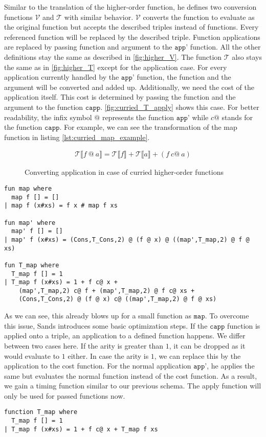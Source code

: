 Similar to the translation of the higher-order function, he defines two conversion functions $\mathcal{V}$ and $\mathcal{T}$ with similar behavior.
$\mathcal{V}$ converts the function to evaluate as the original function but accepts the described triples instead of functions.
Every referenced function will be replaced by the described triple.
Function applications are replaced by passing function and argument to the $\texttt{app'}$ function.
All the other definitions stay the same as described in \autoref{fig:higher_V}.
The function $\mathcal{T}$ also stays the same as in \autoref{fig:higher_T} except for the application case.
For every application currently handled by the $\texttt{app'}$ function, the function and the argument will be converted and added up.
Additionally, we need the cost of the application itself.
This cost is determined by passing the function and the argument to the function $\texttt{capp}$.
\autoref{fig:curried_T_apply} shows this case.
For better readability, the infix symbol $@$ represents the function $\texttt{app'}$ while $c@$ stands for the function $\texttt{capp}$.
For example, we can see the transformation of the map function in listing \ref{lst:curried_map_example}.
\begin{figure}
\begin{align*}
  \mathcal{T}\llbracket f\ @\ a\rrbracket = \mathcal{T}\llbracket f\rrbracket + \mathcal{T}\llbracket a\rrbracket + (f\ c@\ a)
\end{align*}
\caption{Converting application in case of curried higher-order functions}
\label{fig:curried_T_apply}
\end{figure}

\begin{lstlisting}[language=isabelle,mathescape=true,label=lst:curried_map_example,caption=Example translation for map function]
fun map where
  map f [] = []
| map f (x#xs) = f x # map f xs

fun map' where
  map' f [] = []
| map' f (x#xs) = (Cons,T_Cons,2) @ (f @ x) @ ((map',T_map,2) @ f @ xs)

fun T_map where
  T_map f [] = 1
| T_map f (x#xs) = 1 + f c@ x +
    (map',T_map,2) c@ f + (map',T_map,2) @ f c@ xs +
    (Cons,T_Cons,2) @ (f @ x) c@ ((map',T_map,2) @ f @ xs)
\end{lstlisting}

As we can see, this already blows up for a small function as $\texttt{map}$.
To overcome this issue, Sands introduces some basic optimization steps.
If the $\texttt{capp}$ function is applied onto a triple, an application to a defined function happens.
We differ between two cases here.
If the arity is greater than $1$, it can be dropped as it would evaluate to $1$ either.
In case the arity is $1$, we can replace this by the application to the cost function.
For the normal application $\texttt{app'}$, he applies the same but evaluates the normal function instead of the cost function.
As a result, we gain a timing function similar to our previous schema.
The apply function will only be used for passed functions now.
\begin{lstlisting}[language=isabelle,mathescape=true]
function T_map where
  T_map f [] = 1
| T_map f (x#xs) = 1 + f c@ x + T_map f xs
\end{lstlisting}
